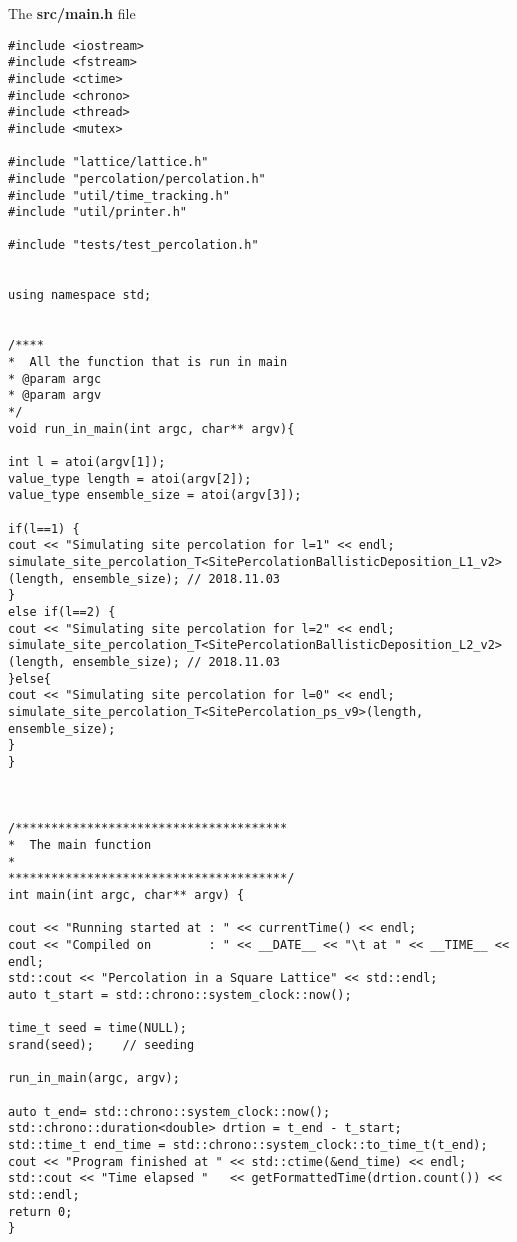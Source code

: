 

The \textbf{src/main.h} file

\begin{lstlisting}[style=CStyle]
#include <iostream>
#include <fstream>
#include <ctime>
#include <chrono>
#include <thread>
#include <mutex>

#include "lattice/lattice.h"
#include "percolation/percolation.h"
#include "util/time_tracking.h"
#include "util/printer.h"

#include "tests/test_percolation.h"


using namespace std;


/****
*  All the function that is run in main
* @param argc
* @param argv
*/
void run_in_main(int argc, char** argv){

int l = atoi(argv[1]);
value_type length = atoi(argv[2]);
value_type ensemble_size = atoi(argv[3]);

if(l==1) {
cout << "Simulating site percolation for l=1" << endl;
simulate_site_percolation_T<SitePercolationBallisticDeposition_L1_v2>(length, ensemble_size); // 2018.11.03
}
else if(l==2) {
cout << "Simulating site percolation for l=2" << endl;
simulate_site_percolation_T<SitePercolationBallisticDeposition_L2_v2>(length, ensemble_size); // 2018.11.03
}else{
cout << "Simulating site percolation for l=0" << endl;
simulate_site_percolation_T<SitePercolation_ps_v9>(length, ensemble_size);
}
}



/**************************************
*  The main function
*
***************************************/
int main(int argc, char** argv) {

cout << "Running started at : " << currentTime() << endl;
cout << "Compiled on        : " << __DATE__ << "\t at " << __TIME__ << endl;
std::cout << "Percolation in a Square Lattice" << std::endl;
auto t_start = std::chrono::system_clock::now();

time_t seed = time(NULL);
srand(seed);    // seeding

run_in_main(argc, argv);

auto t_end= std::chrono::system_clock::now();
std::chrono::duration<double> drtion = t_end - t_start;
std::time_t end_time = std::chrono::system_clock::to_time_t(t_end);
cout << "Program finished at " << std::ctime(&end_time) << endl;
std::cout << "Time elapsed "   << getFormattedTime(drtion.count()) << std::endl;
return 0;
}

\end{lstlisting}